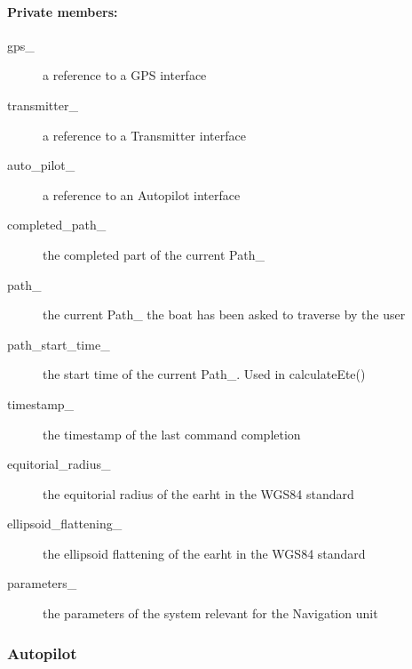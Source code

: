 \paragraph{Private members:}
\begin{adjustwidth}{2.5em}{0pt}\begin{description}
		\item [gps_] a reference to a GPS interface
		\item [transmitter_] a reference to a Transmitter interface
		\item [auto_pilot_] a reference to an Autopilot interface
		\item [completed_path_] the completed part of the current Path_
		\item [path_] the current Path_ the boat has been asked to traverse by the user
		\item [path_start_time_] the start time of the current Path_. Used in calculateEte()
		\item [timestamp_] the timestamp of the last command completion
		\item [equitorial_radius_] the equitorial radius of the earht in the WGS84 standard
		\item [ellipsoid_flattening_] the ellipsoid flattening of the earht in the WGS84 standard
		\item [parameters_] the parameters of the system relevant for the Navigation unit
\end{description}\end{adjustwidth}

\subsubsection{Autopilot}

